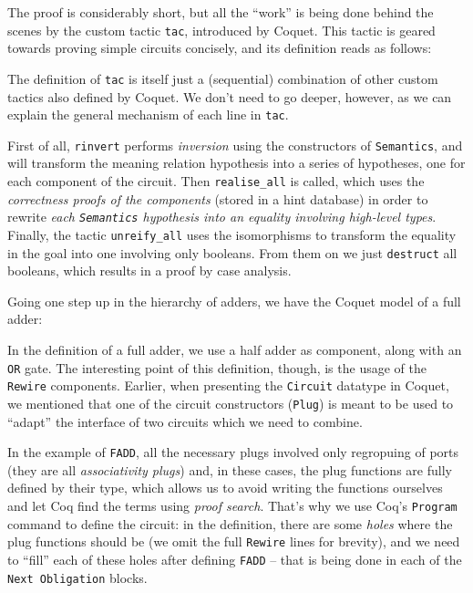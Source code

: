 
            The proof is considerably short, but all the ``work'' is being done behind the scenes by
            the custom tactic \texttt{tac}, introduced by Coquet. This tactic is geared towards
            proving simple circuits concisely, and its definition reads as follows:


            The definition of \texttt{tac} is itself just a (sequential) combination of other custom
            tactics also defined by Coquet. We don't need to go deeper, however, as we can explain
            the general mechanism of each line in \texttt{tac}.

            First of all, \texttt{rinvert} performs \emph{inversion} using the constructors of
            \texttt{Semantics}, and will transform the meaning relation hypothesis into a series of
            hypotheses, one for each component of the circuit. Then \texttt{realise\_all} is called,
            which uses the \emph{correctness proofs of the components} (stored in a hint database)
            in order to rewrite \emph{each \texttt{Semantics} hypothesis into an equality involving
                high-level types}. Finally, the tactic \texttt{unreify\_all} uses the isomorphisms
            to transform the equality in the goal into one involving only booleans. From them on we
            just \texttt{destruct} all booleans, which results in a proof by case analysis.

            Going one step up in the hierarchy of adders, we have the Coquet model of a full adder:


            In the definition of a full adder, we use a half adder as component, along with an
            \texttt{OR} gate. The interesting point of this definition, though, is the usage of the
            \texttt{Rewire} components. Earlier, when presenting the \texttt{Circuit} datatype in
            Coquet, we mentioned that one of the circuit constructors (\texttt{Plug}) is meant to be
            used to ``adapt'' the interface of two circuits which we need to combine.

            In the example of \texttt{FADD}, all the necessary plugs involved only regropuing of ports
            (they are all \emph{associativity plugs}) and, in these cases, the plug functions are
            fully defined by their type, which allows us to avoid writing the functions ourselves
            and let Coq find the terms using \emph{proof search}. That's why we use Coq's
            \texttt{Program} command to define the circuit: in the definition, there are some
            \emph{holes} where the plug functions should be (we omit the full \texttt{Rewire} lines
            for brevity), and we need to ``fill'' each of these holes after defining \texttt{FADD}
            -- that is being done in each of the \texttt{Next Obligation} blocks.

